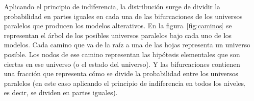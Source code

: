 \documentclass[a4paper,11pt]{book}
\theoremstyle{definition}
\begin{document}

Aplicando el principio de indiferencia, la distribuci\'on surge de dividir la probabilidad en partes iguales en cada una de las bifurcaciones de los universos paralelos que producen los modelos alterativos.
%
En la figura~\ref{fig:caminos} se representan el \'arbol de los posibles universos paralelos bajo cada uno de los modelos.
%
Cada camino que va de la ra\'iz a una de las hojas representa un universo posible.
%
Los nodos de ese camino representan las hip\'otesis elementales que son ciertas en ese universo (o el estado del universo).
%
Y las bifurcaciones contienen una fracci\'on que representa c\'omo se divide la probabilidad entre los universos paralelos (en este caso aplicando el principio de indiferencia en todos los niveles, es decir, se dividen en partes iguales).

%
\end{document}
